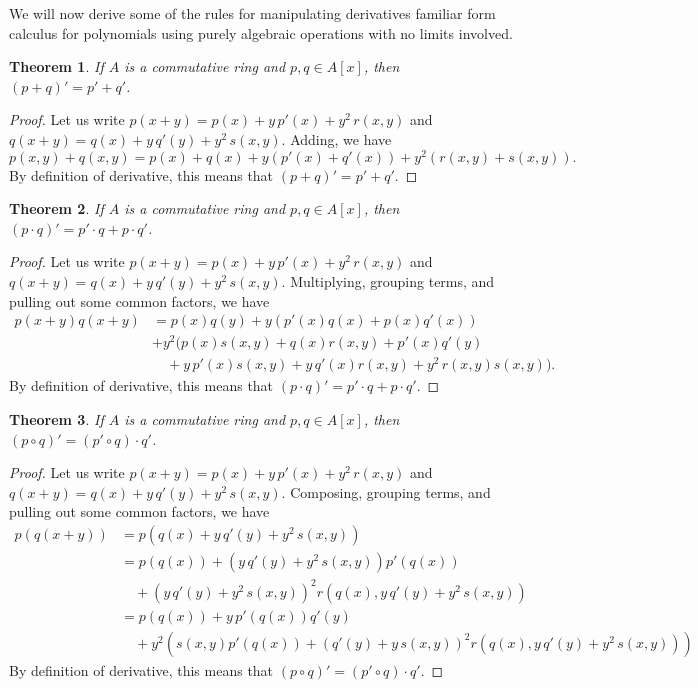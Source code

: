 \documentclass[12pt]{article}
\newtheorem{thm}{Theorem}
\begin{document}
We will now derive some of the rules for manipulating
derivatives familiar form calculus for polynomials using
purely algebraic operations with no limits involved.

\begin{thm}
If $A$ is a commutative ring and $p,q \in A[x]$, then
$(p + q)' = p' + q'$.
\end{thm}

\begin{proof}
Let us write $p(x+y) = p(x) + y \, p'(x) + y^2 \, r(x,y)$
and $q(x+y) = q(x) + y \, q'(y) + y^2 \, s(x,y)$.  Adding,
we have 
\[
p(x,y) + q(x,y) = 
  p(x) + q(x) + y (p'(x) + q'(x)) + 
  y^2 (r(x,y) + s(x,y)).
\]  
By definition of derivative, this means that $(p+q)' = p' + q'$.
\end{proof}

\begin{thm}
If $A$ is a commutative ring and $p,q \in A[x]$, then
$(p \cdot q)' = p' \cdot q + p \cdot q'$.
\end{thm}

\begin{proof}
Let us write $p(x+y) = p(x) + y \, p'(x) + y^2 \, r(x,y)$
and $q(x+y) = q(x) + y \, q'(y) + y^2 \, s(x,y)$.  Multiplying,
grouping terms, and pulling out some common factors, we have
\begin{align*}
 p(x+y) q(x+y) &= p(x) q(y) + y (p'(x) q(x) + p(x) q'(x)) \\ &+ 
   y^2 (p(x) s(x,y) + q(x) r(x,y) + p'(x) q'(y) \\ & \quad+
   y\, p'(x) s(x,y) + y\, q'(x) r(x,y) + y^2 \, r(x,y) s(x,y)).
\end{align*}
By definition of derivative, this means that 
$(p \cdot q)' = p' \cdot q + p \cdot q'$.
\end{proof}

\begin{thm}
If $A$ is a commutative ring and $p,q \in A[x]$, then
$(p \circ q)' = (p' \circ q) \cdot q'$.
\end{thm}

\begin{proof}
Let us write $p(x+y) = p(x) + y \, p'(x) + y^2 \, r(x,y)$
and $q(x+y) = q(x) + y \, q'(y) + y^2 \, s(x,y)$.  Composing,
grouping terms, and pulling out some common factors, we have
\begin{align*}
p(q(x+y)) &= p \left( q(x) + y\,q'(y) + y^2 \, s(x,y) \right) \\
 &= p(q(x)) + \left( y\,q'(y) + y^2 \, s(x,y) \right) p'(q(x)) \\
&\quad+ \left( y\,q'(y) + y^2 \, s(x,y) \right)^2
                r \left( q(x), y\,q'(y) + y^2 \, s(x,y) \right) \\
&= p(q(x)) + y \, p'(q(x)) q'(y) \\ &\quad+
 y^2 \left( s(x,y) p'(q(x)) + \left( q'(y) + y \, s(x,y) \right)^2 
 r \left( q(x), y\,q'(y) + y^2 \, s(x,y) \right) \right)
\end{align*}
By definition of derivative, this means that 
$(p \circ q)' = (p' \circ q) \cdot q'$.
\end{proof}
\end{document}
